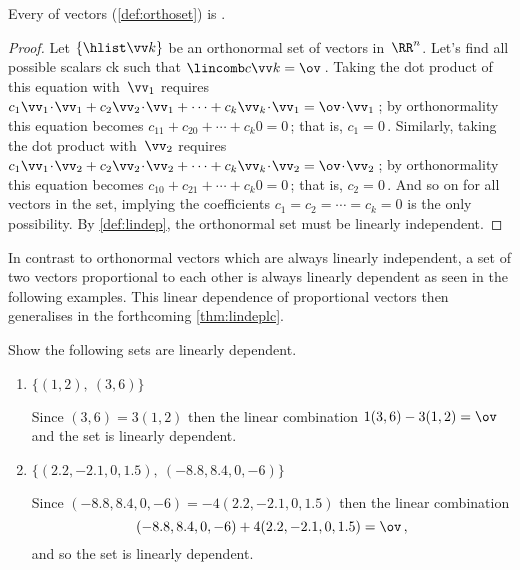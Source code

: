 \begin{theorem} \label{thm:ortholi}
Every  of vectors (\autoref{def:orthoset}) is .
\end{theorem}
\begin{proof} %
Let \(\{\hlist\vv k\}\) be an orthonormal set of vectors in~\(\RR^n\).
Let's find all possible scalars \hlist ck such that \(\lincomb c\vv k=\ov\)\,.
Taking the dot product of this equation with~\(\vv_1\) requires
\(c_1\vv_1\cdot\vv_1+c_2\vv_2\cdot\vv_1+\cdots+c_k\vv_k\cdot\vv_1=\ov\cdot\vv_1\)\,;
by orthonormality this equation becomes
\(c_11+c_20+\cdots+c_k0=0\)\,; that is, \(c_1=0\)\,.
Similarly, taking the dot product with~\(\vv_2\) requires
\(c_1\vv_1\cdot\vv_2+c_2\vv_2\cdot\vv_2+\cdots+c_k\vv_k\cdot\vv_2=\ov\cdot\vv_2\)\,;
by orthonormality this equation becomes
\(c_10+c_21+\cdots+c_k0=0\)\,; that is, \(c_2=0\)\,.
And so on for all vectors in the set, implying the coefficients \(c_1=c_2=\cdots=c_k=0\) is the only possibility.
By \autoref{def:lindep}, the orthonormal set must be linearly independent.
\end{proof}


In contrast to orthonormal vectors which are always linearly independent, a set of two vectors proportional to each other is always linearly dependent as seen in the following examples.
This linear dependence of proportional vectors then generalises in the forthcoming \autoref{thm:lindeplc}.




\begin{example} \label{eg:}
Show the following sets are linearly dependent.
\begin{enumerate}
\item \(\{(1,2),\ (3,6)\}\)
\begin{solution} 
Since \((3,6)=3(1,2)\) then the linear combination \(1(3,6)-3(1,2)=\ov\) and the set is linearly dependent. 
\end{solution}

\item \(\{(2.2,-2.1,0,1.5),\ (-8.8,8.4,0,-6)\}\)
\begin{solution} 
Since  \((-8.8,8.4,0,-6)=-4(2.2,-2.1,0,1.5)\) then the linear combination 
\begin{equation*}
(-8.8,8.4,0,-6)+4(2.2,-2.1,0,1.5)=\ov\,,
\end{equation*}
and so the set is linearly dependent.
\end{solution}
\end{enumerate}
\end{example}




